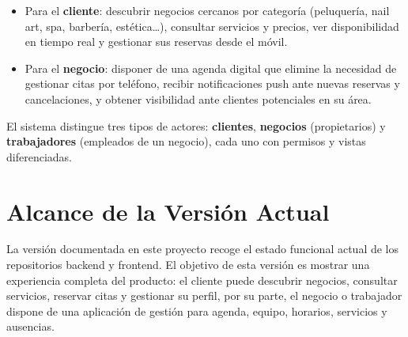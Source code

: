 \documentclass[12pt,a4paper,twoside]{report}
\begin{document}
\begin{itemize}
  \item Para el \textbf{cliente}: descubrir negocios cercanos por categoría (peluquería, nail art, spa, barbería, estética…), consultar servicios y precios, ver disponibilidad en tiempo real y gestionar sus reservas desde el móvil.
  \item Para el \textbf{negocio}: disponer de una agenda digital que elimine la necesidad de gestionar citas por teléfono, recibir notificaciones push ante nuevas reservas y cancelaciones, y obtener visibilidad ante clientes potenciales en su área.
\end{itemize}

El sistema distingue tres tipos de actores: \textbf{clientes}, \textbf{negocios} (propietarios) y \textbf{trabajadores} (empleados de un negocio), cada uno con permisos y vistas diferenciadas.

\section{Alcance de la Versión Actual}

La versión documentada en este proyecto recoge el estado funcional actual de los repositorios backend y frontend. El objetivo de esta versión es mostrar una experiencia completa del producto: el cliente puede descubrir negocios, consultar servicios, reservar citas y gestionar su perfil, por su parte, el negocio o trabajador dispone de una aplicación de gestión para agenda, equipo, horarios, servicios y ausencias.
\end{document}
